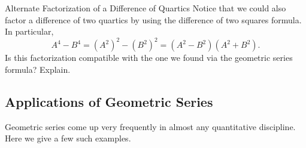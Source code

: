 \begin{exercise}{Alternate Factorization of a Difference of Quartics \Coffeecup}
Notice that we could also factor a difference of two quartics by using the difference of two squares formula.  In particular, $$A^4-B^4=\left(A^2\right)^2-\left(B^2\right)^2=\left(A^2-B^2\right)\left(A^2+B^2\right).$$  Is this factorization compatible with the one we found via the geometric series formula?  Explain.
\end{exercise}
\subsection{Applications of Geometric Series}\label{AppleCations}

Geometric series come up very frequently in almost any quantitative discipline.  Here we give a few such examples.


